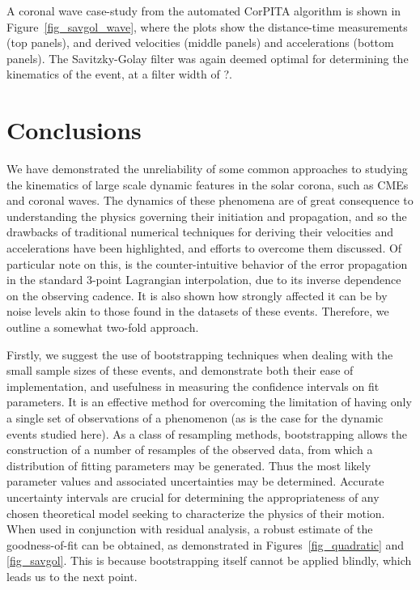 \documentclass[structabstract]{aa}
\begin{document}
A coronal wave case-study from the automated CorPITA algorithm is shown in Figure~\ref{fig_savgol_wave}, where the plots show the distance-time measurements (top panels), and derived velocities (middle panels) and accelerations (bottom panels). The Savitzky-Golay filter was again deemed optimal for determining the kinematics of the event, at a filter width of ?.


\section{Conclusions}
\label{sect:conclusions}

We have demonstrated the unreliability of some common approaches to studying the kinematics of large scale dynamic features in the solar corona, such as CMEs and coronal waves. The dynamics of these phenomena are of great consequence to understanding the physics governing their initiation and propagation, and so the drawbacks of traditional numerical techniques for deriving their velocities and accelerations have been highlighted, and efforts to overcome them discussed. Of particular note on this, is the counter-intuitive behavior of the error propagation in the standard 3-point Lagrangian interpolation, due to its inverse dependence on the observing cadence. It is also shown how strongly affected it can be by noise levels akin to those found in the datasets of these events. Therefore, we outline a somewhat two-fold approach.

Firstly, we suggest the use of bootstrapping techniques when dealing with the small sample sizes of these events, and demonstrate both their ease of implementation, and usefulness in measuring the confidence intervals on fit parameters. It is an effective method for overcoming the limitation of having only a single set of observations of a phenomenon (as is the case for the dynamic events studied here). As a class of resampling methods, bootstrapping allows the construction of a number of resamples of the observed data, from which a distribution of fitting parameters may be generated. Thus the most likely parameter values and associated uncertainties may be determined. Accurate uncertainty intervals are crucial for determining the appropriateness of any chosen theoretical model seeking to characterize the physics of their motion. When used in conjunction with residual analysis, a robust estimate of the goodness-of-fit can be obtained, as demonstrated in Figures~\ref{fig_quadratic} and \ref{fig_savgol}. This is because bootstrapping itself cannot be applied blindly, which leads us to the next point.
\end{document}
